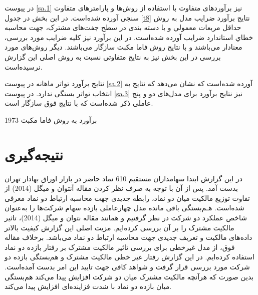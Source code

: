 \documentclass[12pt]{article}
\begin{document}
در پیوست 
\ref{sa.1}
نیز برآورد‌های متفاوت با استفاده از روش‌ها و پارامتر‌های متفاوت سنجی آورده شده‌است. در این بخش 
در جدول 
\ref{t8}
نتایج برآورد ضرایب مدل به روش حداقل مربعات معمولي و با
دسته بندی در سطح جفت‌های مشترک، جهت محاسبه خطاي استاندارد ضرايب آورده شده‌است. در این برآورد نیز کلیه ضرایب مورد بررسی، معنادار می‌باشند و با نتایج روش فاما مکبث سازگار می‌باشند. دیگر روش‌های مورد بررسی در این بخش نیز به نتایج متفاوتی نسبت به روش اصلی این گزارش نرسیده‌است.

نتایج برآورد  تواتر ماهانه در پیوست
\ref{sa.2}
آورده شده‌است که نشان می‌دهد که نتایج به انتخاب تواتر بستگی ندارد.
در پیوست 
\ref{sa.3}
نیز نتایج برآورد برای مدل‌های دو و پنج عاملی ذکر شده‌است که با نتایج فوق سازگار است.




\nopagebreak


\begin{table}[htbp]
\centering
\begin{LTR}
\lr{
   \resizebox{\textwidth}{!}{
   
   }
   }
\end{LTR}
\caption{برآورد به روش فاما مکبث 1973}
\label{t7}
\end{table}

\restoregeometry




\section{نتیجه‌گیری}
در این گزارش ابتدا سهامداران مستقیم 610 نماد حاضر در بازار اوراق بهادار تهران بدست آمد. پس از آن با توجه به صرف نظر کردن مقاله آنتوان و میگل (2014)
از تفاوت توزیع مالکیت میان دو نماد، رابطه جدیدی جهت محاسبه ارتباط دو نماد معرفی شده‌است. هـم‌بستگی
باقی مانده مدل چهارعاملی بازده سهام شرکت‌ها را به‌عنوان  شاخص عملكرد دو شرکت در نظر گرفتیم و همانند مقاله  
نتوان و میگل (2014)، تاثیر مالکیت مشترک را بر آن بررسی کرده‌ایم. مزیت اصلی این گزارش کیفیت بالاتر داده‌های مالکیت و تعریف جدیدی جهت محاسبه ارتباط دو نماد می‌باشد. برخلاف مقاله فوق، از مدل غیرخطی برای بررسی تاثیر مالکیت مشترک بر رفتار بازده دو نماد استفاده کرده‌ایم. در این گزارش رفتار غیر خطی مالکیت مشترک و هم‌بستگی بازده دو شرکت مورد بررسی قرار گرفت و شواهد کافی جهت تایید این امر بدست آمده‌است. بدین صورت که هرآنچه مالکیت مشترک میان دو شرکت افزایش پیدا می‌کند هم‌بستگی میان بازده دو نماد با شدت فزاینده‌ای افزایش پیدا می‌کند. 
\end{document}

